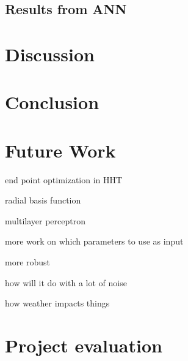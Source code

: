 \documentclass[12pt]{article}
\begin{document}
	
	\subsection{Results from ANN}
		\label{sec:resultsann}
	





\newpage
\section{Discussion}
\label{sec:discussion}







\newpage
\section{Conclusion}
\label{sec:conclusion}






\newpage
\section{Future Work}
\label{sec:futureWork}
	
	end point optimization in HHT
	
	radial basis function
	
	multilayer perceptron
	
	more work on which parameters to use as input
	
	more robust
	
	how will it do with a lot of noise
	
	how weather impacts things

\section{Project evaluation}
\label{sec:projectEvaluation}




\newpage




\appendix





\end{document}
